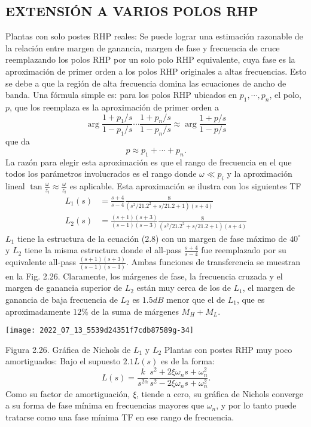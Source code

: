 \subsection{EXTENSIÓN A VARIOS POLOS RHP}
Plantas con solo postes RHP reales: Se puede lograr una estimación razonable de la relación entre margen de ganancia, margen de fase y frecuencia de cruce reemplazando los polos RHP por un solo polo RHP equivalente, cuya fase es la aproximación de primer orden a los polos RHP originales a altas frecuencias. Esto se debe a que la región de alta frecuencia domina las ecuaciones de ancho de banda. Una fórmula simple es: para los polos RHP ubicados en $p_{1}, \cdots, p_{n}$, el polo, $p$, que los reemplaza es la aproximación de primer orden a
$$
\arg \frac{1+p_{1} / s}{1-p_{1} / s} \cdots \frac{1+p_{n} / s}{1-p_{n} / s} \approx \arg \frac{1+p / s}{1-p / s}
$$
que da
$$
p \approx p_{1}+\cdots+p_{n} .
$$
La razón para elegir esta aproximación es que el rango de frecuencia en el que todos los parámetros involucrados es el rango donde $\omega \ll p_{i}$ y la aproximación lineal $\tan \frac{\omega}{z_{i}} \approx \frac{\omega}{z_{i}}$ es aplicable. Esta aproximación se ilustra con los siguientes TF
$$
\begin{aligned}
L_{1}(s) &=\frac{s+4}{s-4} \frac{8}{\left(s^{2} / 21.2^{2}+s / 21.2+1\right)(s+4)} \\
L_{2}(s) &=\frac{(s+1)(s+3)}{(s-1)(s-3)} \frac{8}{\left(s^{2} / 21.2^{2}+s / 21.2+1\right)(s+4)}
\end{aligned}
$$
$L_{1}$ tiene la estructura de la ecuación (2.8) con un margen de fase máximo de $40^{\circ}$ y $L_{2}$ tiene la misma estructura donde el all-pass $\frac{s+4}{s-4}$ fue reemplazado por su equivalente all-pass $\frac{(s+1)(s+3)}{(s-1)(s-3)}$. Ambas funciones de transferencia se muestran en la Fig. 2.26. Claramente, los márgenes de fase, la frecuencia cruzada y el margen de ganancia superior de $L_{2}$ están muy cerca de los de $L_{1}$, el margen de ganancia de baja frecuencia de $L_{2}$ es $1.5 d B$ menor que el de $L_{1}$, que es aproximadamente $12 \%$ de la suma de márgenes $M_{H}+M_{L}$.

\texttt{[image: 2022\_07\_13\_5539d24351f7cdb87589g-34]}

Figura 2.26. Gráfica de Nichols de $L_{1}$ y $L_{2}$ Plantas con postes RHP muy poco amortiguados: Bajo el supuesto $2.1 L(s)$ es de la forma:
$$
L(s)=\frac{k}{s^{2 \alpha}} \frac{s^{2}+2 \xi \omega_{n} s+\omega_{n}^{2}}{s^{2}-2 \xi \omega_{n} s+\omega_{n}^{2}} .
$$
Como su factor de amortiguación, $\xi$, tiende a cero, su gráfica de Nichols converge a su forma de fase mínima en frecuencias mayores que $\omega_{n}$, y por lo tanto puede tratarse como una fase mínima $\mathrm{TF}$ en ese rango de frecuencia.

